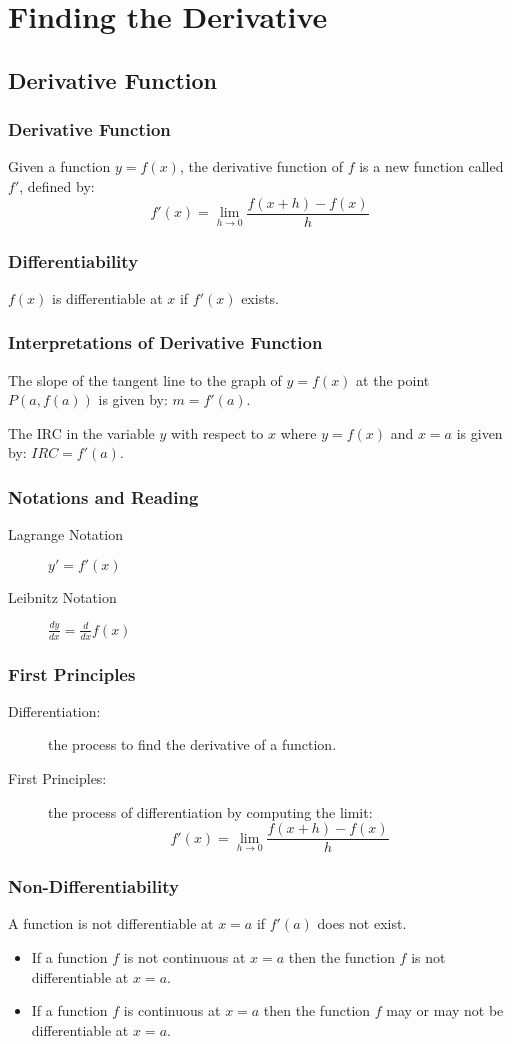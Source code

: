 \setcounter{chapter}{1}
\chapter{Finding the Derivative}
	\section{Derivative Function}
		\subsection{Derivative Function}
			Given a function $y=f(x)$, the derivative function of $f$ is a new function called $f'$, defined by:
			\[f'(x)=\lim_{h \to 0} \frac{f(x+h)-f(x)}{h}\]
		\subsection{Differentiability}
			$f(x)$ is differentiable at $x$ if $f'(x)$ exists.
		\subsection{Interpretations of Derivative Function}
			The slope of the tangent line to the graph of $y=f(x)$ at the point $P(a, f(a))$ is given by: $m=f'(a)$.

			The IRC in the variable $y$ with respect to $x$ where $y=f(x)$ and $x=a$ is given by: $IRC = f'(a)$.
		\subsection{Notations and Reading}
			\begin{description}
				\item[Lagrange Notation] $y' = f'(x)$
				\item[Leibnitz Notation] $\frac{dy}{dx} = \frac{d}{dx}f(x)$
			\end{description}
		\subsection{First Principles}
			\begin{description}
				\item[Differentiation:] the process to find the derivative of a function.
				\item[First Principles:] the process of differentiation by computing the limit:
					\[f'(x) = \lim_{h \to 0} \frac{f(x+h)-f(x)}{h}\]
			\end{description}
		\subsection{Non-Differentiability}
			A function is not differentiable at $x=a$ if $f'(a)$ does not exist.
			\begin{itemize}
				\item If a function $f$ is not continuous at $x=a$ then the function $f$ is not differentiable at $x=a$.
				\item If a function $f$ is continuous at $x=a$ then the function $f$ may or may not be differentiable at $x=a$.
			\end{itemize}
